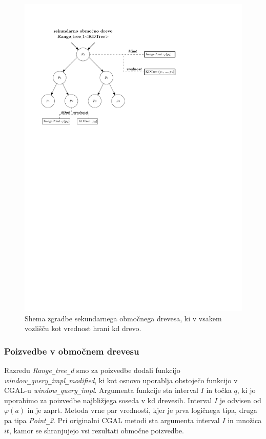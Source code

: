 \documentclass[a4paper, 12pt]{book}
\newcommand{\U}{\texttt{\_}}
\begin{document}
\begin{figure}[htp]
\centerline{\includegraphics[scale=1]{pics/range-dual-kd-2.pdf}}
\caption{Shema zgradbe sekundarnega območnega drevesa, ki v vsakem vozlišču kot vrednost hrani kd drevo.}
\label{range-dual-kd}
\end{figure}

\subsubsection{Poizvedbe v območnem drevesu}
Razredu \textit{Range\U tree\U d} smo za poizvedbe dodali funkcijo \textit{window\U qu\-ery\U im\-pl\U mo\-di\-fied}, ki  kot osnovo uporablja obstoječo funkcijo v CGAL-u \textit{window\U qu\-ery\U impl}. Argumenta funkcije sta interval $I$ in točka $q$, ki jo uporabimo za poizvedbe najbližjega soseda v kd drevesih. Interval $I$ je odvisen od $\varphi (a)$ in je zaprt. Metoda vrne par vrednosti, kjer je prva logičnega tipa, druga pa tipa \textit{Point\U 2}. Pri originalni CGAL metodi sta argumenta interval $I$ in množica $it$, kamor se shranjujejo vsi rezultati območne poizvedbe.
\end{document}

